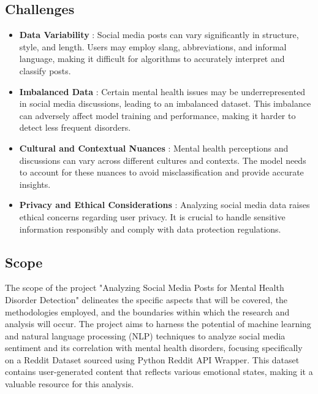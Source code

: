 \subsection{Challenges}
\begin{itemize}
    \item \textbf{Data Variability} :
    \noindent
    Social media posts can vary significantly in structure, style, and length. Users may employ slang, abbreviations, and informal language, making it difficult for algorithms to accurately interpret and classify posts.

    \item \textbf{Imbalanced Data} :
    \noindent
    Certain mental health issues may be underrepresented in social media discussions, leading to an imbalanced dataset. This imbalance can adversely affect model training and performance, making it harder to detect less frequent disorders.

    \item \textbf{Cultural and Contextual Nuances} :
    \noindent
    Mental health perceptions and discussions can vary across different cultures and contexts. The model needs to account for these nuances to avoid misclassification and provide accurate insights.

    \item \textbf{Privacy and Ethical Considerations} :
    \noindent
    Analyzing social media data raises ethical concerns regarding user privacy. It is crucial to handle sensitive information responsibly and comply with data protection regulations.
    
\end{itemize}

\subsection{Scope}
\noindent
The scope of the project "Analyzing Social Media Posts for Mental Health Disorder Detection" delineates the specific aspects that will be covered, the methodologies employed, and the boundaries within which the research and analysis will occur. The project aims to harness the potential of machine learning and natural language processing (NLP) techniques to analyze social media sentiment and its correlation with mental health disorders, focusing specifically on a Reddit Dataset sourced using Python Reddit API Wrapper. This dataset contains user-generated content that reflects various emotional states, making it a valuable resource for this analysis.

